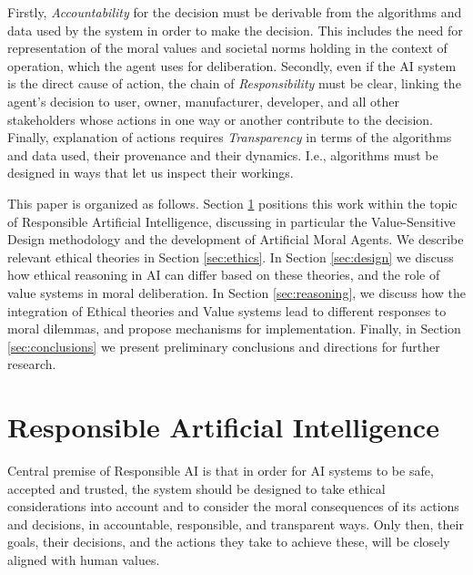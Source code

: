 \documentclass[twocolumn]{article}
\begin{document}
Firstly, \textit{Accountability} for the decision must be derivable from the algorithms and data used by the system in order to make the decision. This includes the need for representation of the moral values and societal norms holding in the context of operation, which the agent uses for deliberation. Secondly, even if the AI system is the direct cause of action, the chain of \textit{Responsibility} must be clear, linking the agent's decision to user, owner, manufacturer, developer, and all other stakeholders whose actions in one way or another contribute to the decision. %
Finally, explanation of actions requires \textit{Transparency} in terms of the algorithms and data used, their provenance and their dynamics. I.e., algorithms must be designed in ways that let us inspect their workings.




This paper is organized as follows. Section \ref{sec:rai} positions this work within the topic of Responsible Artificial Intelligence, discussing in particular the Value-Sensitive Design methodology and  the development of Artificial Moral Agents.  We describe relevant ethical theories in Section \ref{sec:ethics}. In Section \ref{sec:design} we discuss how ethical reasoning in AI can differ based on these theories, and the role of value systems in moral deliberation. %
In Section \ref{sec:reasoning}, we discuss how the integration of Ethical theories and Value systems lead to different responses to moral dilemmas, and propose mechanisms for implementation. Finally, in Section \ref{sec:conclusions} we present preliminary conclusions and directions for further research.









\section{Responsible Artificial Intelligence}\label{sec:rai}

Central premise of Responsible AI is that in order for AI systems to be safe, accepted and trusted, the system should be designed to take ethical considerations into account and to consider the moral consequences of its actions and decisions, in accountable, responsible, and transparent ways. Only then, their goals, their decisions, and the actions they take to achieve these, will be closely aligned with human values. 
\end{document}
